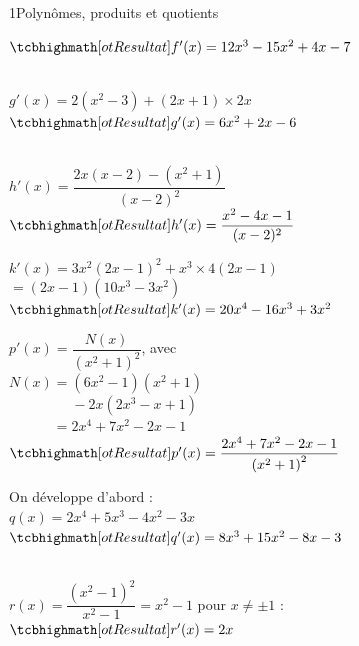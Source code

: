 

\begin{deuxcolonnes}

\begin{corrige}{1}{Polynômes, produits et quotients}
\begin{questions}
  \item $\res{f'(x)=12x^{3}-15x^{2}+4x-7}$
  \item {}\\
    $g'(x)=2\left(x^{2}-3\right)+(2x+1)\times2x$\\ $\res{g'(x)=6x^{2}+2x-6}$
  \item {}\\
    $h'(x)=\dfrac{2x(x-2)-\left(x^{2}+1\right)}{(x-2)^{2}}$\\[1mm]
    $\res{h'(x)=\dfrac{x^{2}-4x-1}{(x-2)^{2}}}$
  \item $k'(x)=3x^{2}(2x-1)^{2}+x^{3}\times4(2x-1)$\\ $=(2x-1)\left(10x^{3}-3x^{2}\right)$\\
    $\res{k'(x)=20x^{4}-16x^{3}+3x^{2}}$
  \item $p'(x)=\dfrac{N(x)}{\left(x^{2}+1\right)^{2}}$, avec\\
    $N(x)=\left(6x^{2}-1\right)\left(x^{2}+1\right)$\\
    $\phantom{N(x)=}-2x\left(2x^{3}-x+1\right)$\\
    $\phantom{N(x)}=2x^{4}+7x^{2}-2x-1$\\[1mm]
    $\res{p'(x)=\dfrac{2x^{4}+7x^{2}-2x-1}{\left(x^{2}+1\right)^{2}}}$
  \item On développe d'abord :\\ $q(x)=2x^{4}+5x^{3}-4x^{2}-3x$\\
    $\res{q'(x)=8x^{3}+15x^{2}-8x-3}$
  \item {}\\
    $r(x)=\dfrac{\left(x^{2}-1\right)^{2}}{x^{2}-1}=x^{2}-1$ pour $x\neq\pm1$ : $\res{r'(x)=2x}$
\end{questions}
\end{corrige}


\end{deuxcolonnes}
